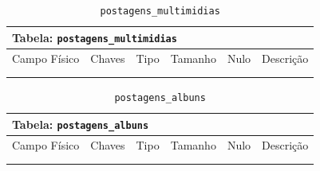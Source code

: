 \documentclass[12pt,a4paper]{article}
\begin{document}
\begin{center}
\begin{table}[h!]
	\caption{\texttt{postagens\_multimidias}}
	\label{tabela:postagensMultimidias}
	\begin{tabular}{|p{2.3cm}|p{1.2cm}|p{1.8cm}|p{1.5cm}|p{1cm}|p{6cm}|}\hline		
		\multicolumn{6}{|p{16cm}|}{\cellcolor{cinzaClaro}  \centering Tabela: \texttt{postagens\_multimidias}} \\ \hline %
		{\small Campo Físico}   & {\small Chaves} & {\small Tipo} & {\small Tamanho} & {\small Nulo} & {\small Descrição}\\\hline %
		
		{\tiny } & {\tiny } & {\tiny } & {\tiny } & {\tiny } &{\tiny }\\\hline
		{\tiny } & {\tiny } & {\tiny } & {\tiny } & {\tiny } &{\tiny }\\\hline
	
			
	\end{tabular}
\end{table}	
\end{center}

\begin{center}
\begin{table}[h!]
	\caption{\texttt{postagens\_albuns}}
	\label{tabela:postagensAlbuns}
	\begin{tabular}{|p{2.3cm}|p{1.2cm}|p{1.8cm}|p{1.5cm}|p{1cm}|p{6cm}|}\hline	
		\multicolumn{6}{|p{16cm}|}{\cellcolor{cinzaClaro}  \centering Tabela: \texttt{postagens\_albuns}} \\ \hline %
		{\small Campo Físico}   & {\small Chaves} & {\small Tipo} & {\small Tamanho} & {\small Nulo} & {\small Descrição}\\\hline %
		
		{\tiny } & {\tiny } & {\tiny } & {\tiny } & {\tiny } &{\tiny }\\\hline
		{\tiny } & {\tiny } & {\tiny } & {\tiny } & {\tiny } &{\tiny }\\\hline
			
	\end{tabular}
\end{table}	
\end{center}
\end{document}
